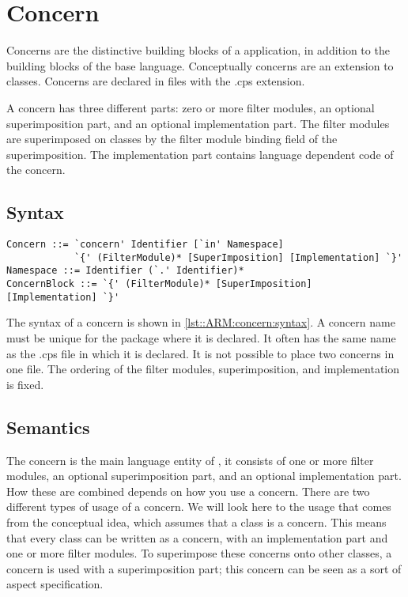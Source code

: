 \chapter{Concern} \label{chapter:concern}
Concerns are the distinctive building blocks of a \Compose* application, in addition to the building blocks
of the base language. Conceptually concerns are an extension to classes.
Concerns are declared in files with the .cps extension.

A concern has three different parts: zero or more filter modules, an optional superimposition part, and an optional implementation part. The filter modules are superimposed
on classes by the filter module binding field of the superimposition. The implementation part contains
language dependent code of the concern.

\section*{Syntax}
\begin{lstlisting}[caption = {Concern syntax}, label = lst::ARM:concern:syntax,
style = listing, language = ebnf, float = tpb]
Concern ::= `concern' Identifier [`in' Namespace]
            `{' (FilterModule)* [SuperImposition] [Implementation] `}'
Namespace ::= Identifier (`.' Identifier)*
ConcernBlock ::= `{' (FilterModule)* [SuperImposition] [Implementation] `}'               
\end{lstlisting}
The syntax of a concern is shown in \autoref{lst::ARM:concern:syntax}. A concern name must be unique for the package where it is declared. It often has the same name as the .cps file in which it is declared. It is not possible to place two concerns in one file.
The ordering of the filter modules, superimposition, and implementation is fixed.

\section*{Semantics}
The concern is the main language entity of \Compose*, it consists of one or more filter modules,
an optional superimposition part, and an optional implementation part. How these are combined depends on how you use
a \Compose* concern. There are two different types of usage of a concern. We will look here to the usage that comes from the conceptual idea, which assumes that a
class is a concern. 
This means that every class can be written as a concern, with an implementation part and one or more filter modules. To superimpose these concerns onto other classes, a concern is used with a superimposition part; this concern can be seen as a sort of aspect specification.

